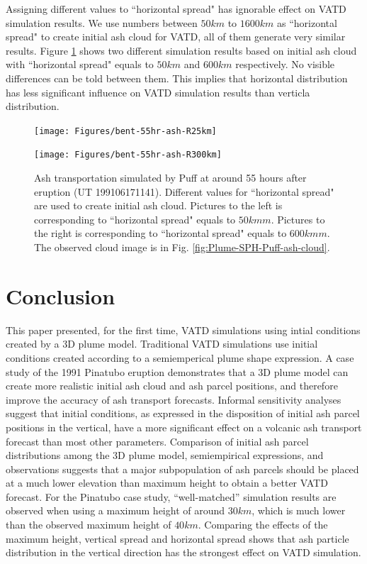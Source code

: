 \documentclass[draft,linenumbers]{agujournal2019}
\begin{document}
Assigning different values to ``horizontal spread" has ignorable effect on VATD simulation results. We use numbers between $50 km$ to $1600 km$ as ``horizontal spread" to create initial ash cloud for VATD, all of them generate very similar results. Figure \ref{fig:ash-distribution-horizontal-compare} shows two different simulation results based on initial ash cloud with ``horizontal spread" equals to $50 km$ and $600 km$ respectively. No visible differences can be told between them. This implies that horizontal distribution has less significant influence on VATD simulation results than verticla distribution.

\begin{figure}[!htb]
\centering
    \begin{minipage}{.325 \textwidth}
        \centering
        \texttt{[image: Figures/bent-55hr-ash-R25km]}
    \end{minipage}%
    \begin{minipage}{.325 \textwidth}
        \centering
        \texttt{[image: Figures/bent-55hr-ash-R300km]}
    \end{minipage}%
    \caption{Ash transportation simulated by Puff at around 55 hours after eruption (UT 199106171141). Different values for ``horizontal spread" are used to create initial ash cloud. Pictures to the left is corresponding to ``horizontal spread" equals to $50 km m$. Pictures to the right is corresponding to ``horizontal spread" equals to $600 km m$. The observed cloud image is in Fig. \ref{fig:Plume-SPH-Puff-ash-cloud}.}
    \label{fig:ash-distribution-horizontal-compare}
\end{figure}

\section{Conclusion}

This paper presented, for the first time, VATD simulations using intial conditions created by a 3D plume model.  Traditional VATD simulations use initial conditions created according to a semiemperical plume shape expression. A case study of the 1991 Pinatubo eruption demonstrates that a 3D plume model can create more realistic initial ash cloud and ash parcel positions, and therefore improve the accuracy of ash transport forecasts.  Informal sensitivity analyses suggest that initial conditions, as expressed in the disposition of initial ash parcel positions in the vertical, have a more significant effect on a volcanic ash transport forecast than most other parameters. Comparison of initial ash parcel distributions among the 3D plume model, semiempirical expressions, and observations suggests that a major subpopulation of ash parcels should be placed at a much lower elevation than maximum height to obtain a better VATD forecast. For the Pinatubo case study, ``well-matched'' simulation results are observed when using a maximum height of around $30 km$, which is much lower than the observed maximum height of $40 km$. Comparing the effects of the maximum height, vertical spread and horizontal spread shows that ash particle distribution in the vertical direction has the strongest effect on VATD simulation.
\end{document}
